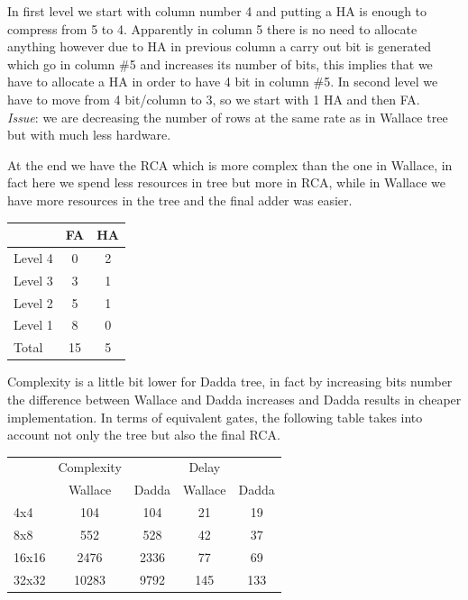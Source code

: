 In first level we start with column number 4 and putting a HA is enough to compress from 5 to 4. Apparently in column 5 there is no need to allocate anything however due to HA in previous column a carry out bit is generated which go in column \#5 and increases its number of bits, this implies that we have to allocate a HA in order to have 4 bit in column \#5. In second level we have to move from 4 bit/column to 3, so we start with 1 HA and then FA. \\

\textit{Issue}: we are decreasing the number of rows at the same rate as in Wallace tree but with much less hardware.

At the end we have the RCA which is more complex than the one in Wallace, in fact here we spend less resources in tree but more in RCA, while in Wallace we have more resources in the tree and the final adder was easier.

 \begin{center}
  \begin{tabular}{|l|c|c|}
    \hline
    & FA & HA\\
    \hline
    Level 4&    0&    2\\
    Level 3&    3&    1\\
    Level 2&    5&    1\\
    Level 1&    8&    0\\
    \hline
    Total&      15&   5\\
    \hline
  \end{tabular}
 \end{center}

Complexity is a little bit lower for Dadda tree, in fact by increasing bits number the difference between Wallace and Dadda increases and Dadda results in cheaper implementation.
In terms of equivalent gates, the following table takes into account not only the tree but also the final RCA.

\begin{center}
  \begin{tabular}{|l|c|c|c|c|}
    \hline
    & Complexity & & Delay &\\
    & Wallace & Dadda& Wallace& Dadda\\
    \hline
    4x4&    104&    104&    21&     19 \\
    8x8&    552&    528&    42&     37 \\
    16x16&    2476&   2336&   77&     69 \\
    32x32&    10283&    9792&   145&    133 \\
    \hline
  \end{tabular}
\end{center}

